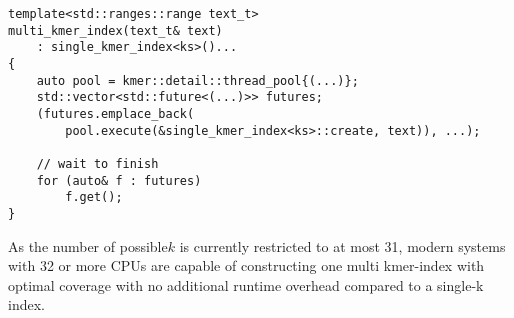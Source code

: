 \begin{lstlisting}[caption={Paralell invocation of the create function for individual kmer-index
elements during construction of the multi kmer-index.}]
template<std::ranges::range text_t>
multi_kmer_index(text_t& text)
	: single_kmer_index<ks>()...
{
	auto pool = kmer::detail::thread_pool{(...)};
	std::vector<std::future<(...)>> futures;
	(futures.emplace_back(
		pool.execute(&single_kmer_index<ks>::create, text)), ...);

	// wait to finish
	for (auto& f : futures)
		f.get();
}
\end{lstlisting}

As the number of possible$k$ is currently restricted to at most 31,
modern systems with 32 or more CPUs are capable of constructing one
multi kmer-index with optimal coverage with no additional runtime
overhead compared to a single-k index.

\pagebreak{}




